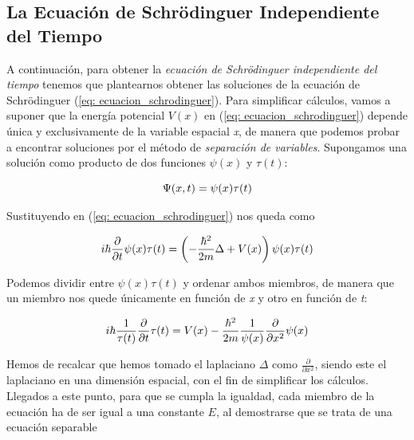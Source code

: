 \documentclass{article}
\numberwithin{equation}{section} %
\begin{document}
    \subsection{La Ecuación de Schrödinguer Independiente del Tiempo}

    \vspace{5mm}

    A continuación, para obtener la \textit{ecuación de Schrödinguer independiente del tiempo} tenemos que plantearnos obtener las soluciones de la ecuación de Schrödinguer (\ref{eq: ecuacion_schrodinguer}). Para simplificar cálculos, vamos a suponer que la energía potencial \( V(x) \) en (\ref{eq: ecuacion_schrodinguer}) depende única y exclusivamente de la variable espacial \textit{x}, de manera que podemos probar a encontrar soluciones por el método de \textit{separación de variables}. Supongamos una solución como producto de dos funciones \( \psi(x) \) y \( \tau(t) \):

    \begin{equation*}
        \Psi(x, t) = \psi(x) \tau(t) \\[5pt]
    \end{equation*}

    Sustituyendo en (\ref{eq: ecuacion_schrodinguer}) nos queda como

    \begin{equation*}
        i \hbar \frac{\partial}{\partial t} \psi(x) \tau(t) = \left( - \frac{\hbar^{2}}{2m} \Delta + V(x) \right) \psi(x) \tau(t) \\[5pt]
    \end{equation*}

    Podemos dividir entre \( \psi(x) \tau(t) \) y ordenar ambos miembros, de manera que un miembro nos quede únicamente en función de \textit{x} y otro en función de \textit{t}:

    \begin{equation*}
        i \hbar \frac{1}{\tau(t)} \frac{\partial}{\partial t} \tau(t) = V(x) - \frac{\hbar^{2}}{2m} \frac{1}{\psi(x)} \frac{\partial}{\partial x^{2}} \psi(x) \\[5pt]
    \end{equation*}

    Hemos de recalcar que hemos tomado el laplaciano \( \Delta \) como \( \frac{\partial}{\partial x^{2}} \), siendo este el laplaciano en una dimensión espacial, con el fin de simplificar los cálculos. Llegados a este punto, para que se cumpla la igualdad, cada miembro de la ecuación ha de ser igual a una constante \( E \), al demostrarse que se trata de una ecuación separable
    
\end{document}
